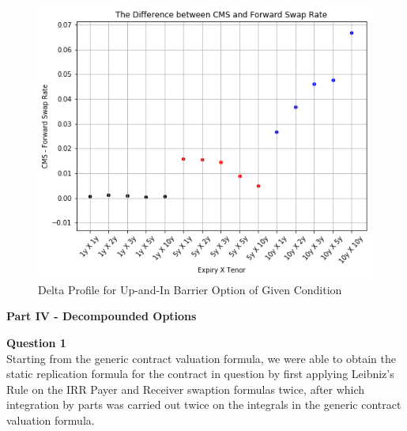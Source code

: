 \documentclass{article}
\begin{document}
\begin{figure}[ht]
	\centering
	\includegraphics[scale=0.45]{CMS_FSR.png}
	\caption{Delta Profile for Up-and-In Barrier Option of Given Condition}
\end{figure}

\newpage

\par \noindent \textbf{Part IV - Decompounded Options}\\
\par \noindent \textbf{Question 1}\\

\noindent Starting from the generic contract valuation formula, we were able to obtain the static replication formula for the contract in question by first applying Leibniz's Rule on the IRR Payer and Receiver swaption formulas twice, after which integration by parts was carried out twice on the integrals in the generic contract valuation formula. \\
\end{document}
